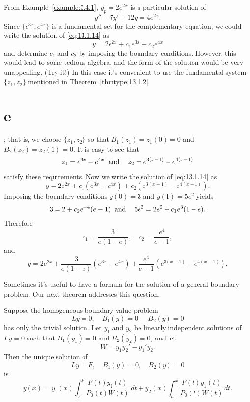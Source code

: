 \begin{examplesolution}
\solution From Example~\ref{example:5.4.1}, $y_{p}=2e^{2x}$ is a particular solution of
\begin{equation}
  \label{eq:13.1.14}y''-7y'+12y=4e^{2x}.
\end{equation}
Since $\{e^{3x},e^{4x}\}$ is a fundamental set for the complementary equation, we could write the
solution of \eqref{eq:13.1.14} as
\[
  y=2e^{2x}+c_{1}e^{3x}+c_{2}e^{4x}
\]
and determine $c_{1}$ and $c_{2}$ by imposing the boundary conditions. However, this would lead to
some tedious algebra, and the form of the solution would be very unappealing. (Try it!) In this case
it's convenient to use the fundamental system $\{z_{1},z_{2}\}$ mentioned in
Theorem~\ref{thmtype:13.1.2}\part{e}; that is, we choose $\{z_{1},z_{2}\}$ so that
$B_{1}(z_{1})=z_{1}(0)=0$ and $B_{2}(z_{2})=z_{2}(1)=0$. It is easy to see that
\[
  z_{1}=e^{3x}-e^{4x}\text{\; and\; \; }z_{2}=e^{3(x-1)}-e^{4(x-1)}
\]
satisfy these requirements. Now we write the solution of \eqref{eq:13.1.14} as
\[
  y=2e^{2x}+c_{1}\left(e^{3x}-e^{4x}\right)+c_{2}\left(e^{3(x-1)}-e^{4(x-1)}\right).
\]
Imposing the boundary conditions $y(0)=3$ and $y(1)=5e^{2}$ yields
\[
  3=2+c_{2}e^{-4}(e-1)\text{\; and\; \; }5e^{2}=2e^{2}+c_{1}e^{3}(1-e).
\]
Therefore
\[
  c_{1}=\frac{3}{e(1-e)},\quad c_{2}=\frac{e^{4}}{e-1},
\]
and
\[
  y=2e^{2x}+\frac{3}{e(1-e)}(e^{3x}-e^{4x})+ \frac{e^{4}}{e-1}(e^{3(x-1)}-e^{4(x-1)}).
\]
\end{examplesolution}

Sometimes it's useful to have a formula for the solution of a general boundary problem. Our next
theorem addresses this question.

\begin{theorem}
  \color{blue}
  \label{thmtype:13.1.3} Suppose the homogeneous boundary value problem
  \begin{equation}
    \label{eq:13.1.15}Ly=0,\quad B_{1}(y)=0,\quad B_{2}(y)=0
  \end{equation}
  has only the trivial solution. Let $y_{1}$ and $y_{2}$ be linearly independent solutions of $Ly=0$
  such that $B_{1}(y_{1})=0$ and $B_{2}(y_{2})=0$, and let
  \[
    W=y_{1}y_{2}'-y_{1}'y_{2}.
  \]
  Then the unique solution of
  \begin{equation}
    \label{eq:13.1.16}Ly=F,\quad B_{1}(y)=0,\quad B_{2}(y)=0
  \end{equation}
  is
  \begin{equation}
    \label{eq:13.1.17}y(x)=y_{1}(x)\int_{x}^{b}\frac{F(t)y_{2}(t)}{P_{0}(t)W(t)}\,dt+ y_{2}(x)\int_{a}^{x}\frac{F(t)y_{1}(t)}{P_{0}(t)W(t)}\,dt.
  \end{equation}
\end{theorem}

